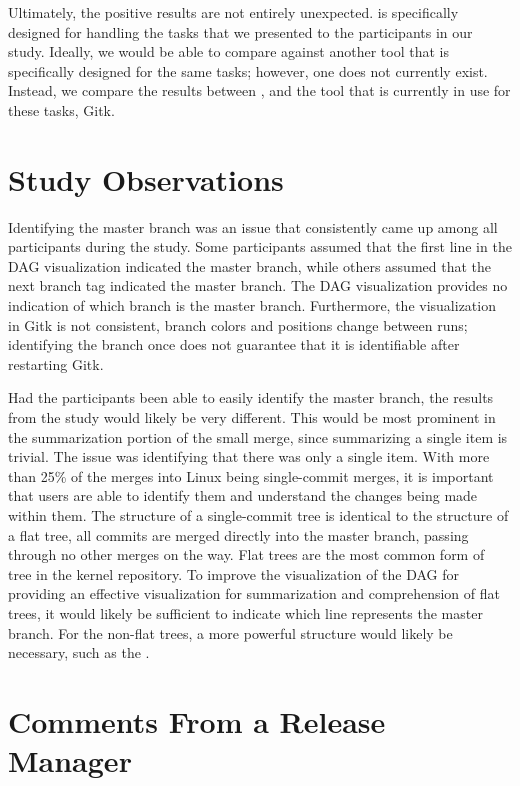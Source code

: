 Ultimately, the positive results are not entirely unexpected.
\tool{} is specifically designed for handling the tasks that we
presented to the participants in our study.
Ideally, we would be able to compare against another tool that is
specifically designed for the same tasks; however, one does not
currently exist.
Instead, we compare the results between \tool{}, and the tool that is
currently in use for these tasks, Gitk.

\section{Study Observations}\label{sec:study_observations}

Identifying the master branch was an issue that consistently came up
among all participants during the study. Some participants assumed that
the first line in the DAG visualization indicated the master branch,
while others assumed that the next branch tag indicated the master
branch. The DAG visualization provides no indication of which branch is
the master branch. Furthermore, the visualization in Gitk is not
consistent, branch colors and positions change between runs; identifying
the branch once does not guarantee that it is identifiable after
restarting Gitk.

Had the participants been able to easily identify the master branch, the
results from the study would likely be very different. This would be
most prominent in the summarization portion of the small merge, since
summarizing a single item is trivial.
The issue was identifying that there was only a single item.
With more than 25\% of the merges into Linux being single-commit merges,
it is important that users are able to identify them and understand the
changes being made within them. The structure of a single-commit tree is
identical to the structure of a flat tree, all commits are merged
directly into the master branch, passing through no other merges on the
way. Flat trees are the most common form of tree in the kernel
repository. To improve the visualization of the DAG for providing an
effective visualization for summarization and comprehension of flat
trees, it would likely be sufficient to indicate which line represents
the master branch.
For the non-flat trees, a more powerful structure would likely be
necessary, such as the \mt{}.

\section{Comments From a Release Manager}\label{sec:comments_from_a_release_manager}

